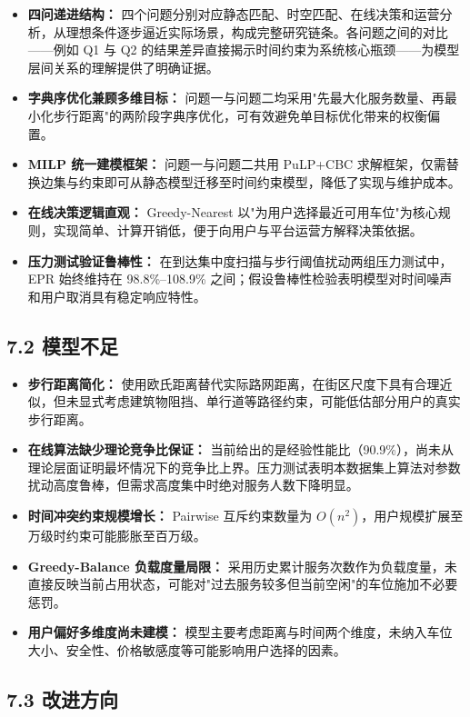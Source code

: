 \documentclass{ctexart}
\begin{document}
\begin{itemize}
  \item \textbf{四问递进结构：} 四个问题分别对应静态匹配、时空匹配、在线决策和运营分析，从理想条件逐步逼近实际场景，构成完整研究链条。各问题之间的对比——例如 Q1 与 Q2 的结果差异直接揭示时间约束为系统核心瓶颈——为模型层间关系的理解提供了明确证据。
  \item \textbf{字典序优化兼顾多维目标：} 问题一与问题二均采用"先最大化服务数量、再最小化步行距离"的两阶段字典序优化，可有效避免单目标优化带来的权衡偏置。
  \item \textbf{MILP 统一建模框架：} 问题一与问题二共用 PuLP+CBC 求解框架，仅需替换边集与约束即可从静态模型迁移至时间约束模型，降低了实现与维护成本。
  \item \textbf{在线决策逻辑直观：} Greedy-Nearest 以"为用户选择最近可用车位"为核心规则，实现简单、计算开销低，便于向用户与平台运营方解释决策依据。
  \item \textbf{压力测试验证鲁棒性：} 在到达集中度扫描与步行阈值扰动两组压力测试中，EPR 始终维持在 98.8\%--108.9\% 之间；假设鲁棒性检验表明模型对时间噪声和用户取消具有稳定响应特性。
\end{itemize}

\subsection*{7.2 模型不足}

\begin{itemize}
  \item \textbf{步行距离简化：} 使用欧氏距离替代实际路网距离，在街区尺度下具有合理近似，但未显式考虑建筑物阻挡、单行道等路径约束，可能低估部分用户的真实步行距离。
  \item \textbf{在线算法缺少理论竞争比保证：} 当前给出的是经验性能比（90.9\%），尚未从理论层面证明最坏情况下的竞争比上界。压力测试表明本数据集上算法对参数扰动高度鲁棒，但需求高度集中时绝对服务人数下降明显。
  \item \textbf{时间冲突约束规模增长：} Pairwise 互斥约束数量为 $O(n^2)$，用户规模扩展至万级时约束可能膨胀至百万级。
  \item \textbf{Greedy-Balance 负载度量局限：} 采用历史累计服务次数作为负载度量，未直接反映当前占用状态，可能对"过去服务较多但当前空闲"的车位施加不必要惩罚。
  \item \textbf{用户偏好多维度尚未建模：} 模型主要考虑距离与时间两个维度，未纳入车位大小、安全性、价格敏感度等可能影响用户选择的因素。
\end{itemize}

\subsection*{7.3 改进方向}
\end{document}
